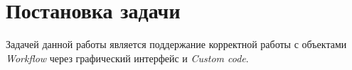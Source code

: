 \section{Постановка задачи}
Задачей данной работы является поддержание корректной работы с объектами \emph{Workflow} через графический интерфейс и \emph{Custom code}.


